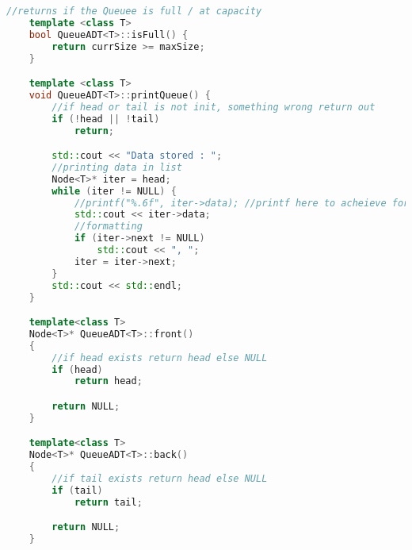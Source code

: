 \documentclass{report}
\begin{document}
\begin{lstlisting}[language=C++]
	//returns if the Queuee is full / at capacity
	template <class T>
	bool QueueADT<T>::isFull() {
		return currSize >= maxSize;
	}

	template <class T>
	void QueueADT<T>::printQueue() {
		//if head or tail is not init, something wrong return out
		if (!head || !tail)
			return;

		std::cout << "Data stored : ";
		//printing data in list
		Node<T>* iter = head;
		while (iter != NULL) {
			//printf("%.6f", iter->data); //printf here to acheieve format
			std::cout << iter->data;
			//formatting
			if (iter->next != NULL)
				std::cout << ", ";
			iter = iter->next;
		}
		std::cout << std::endl;
	}

	template<class T>
	Node<T>* QueueADT<T>::front()
	{
		//if head exists return head else NULL
		if (head)
			return head;

		return NULL;
	}

	template<class T>
	Node<T>* QueueADT<T>::back()
	{
		//if tail exists return head else NULL
		if (tail)
			return tail;

		return NULL;
	}

\end{lstlisting}
\end{document}
